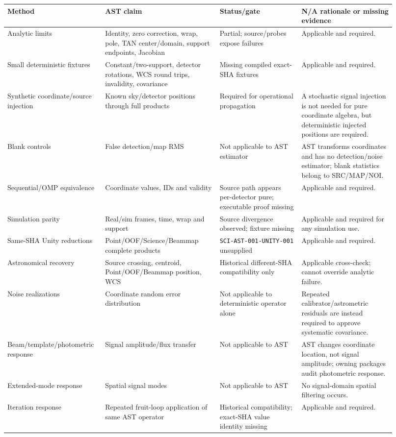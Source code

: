 \documentclass[11pt]{article}
\newcommand{\code}[1]{\nolinkurl{#1}}
\begin{document}
\begin{longtable}{L{0.21\linewidth}L{0.28\linewidth}L{0.20\linewidth}L{0.23\linewidth}}
\toprule
Method & AST claim & Status/gate & N/A rationale or missing evidence \\
\midrule
\endhead
Analytic limits & Identity, zero correction, wrap, pole, TAN center/domain, support endpoints, Jacobian & Partial; source/probes expose failures & Applicable and required. \\
Small deterministic fixtures & Constant/two-support, detector rotations, WCS round trips, invalidity, covariance & Missing compiled exact-SHA fixtures & Applicable and required. \\
Synthetic coordinate/source injection & Known sky/detector positions through full products & Required for operational propagation & A stochastic signal injection is not needed for pure coordinate algebra, but deterministic injected positions are required. \\
Blank controls & False detection/map RMS & Not applicable to AST estimator & AST transforms coordinates and has no detection/noise estimator; blank statistics belong to SRC/MAP/NOI. \\
Sequential/OMP equivalence & Coordinate values, IDs and validity & Source path appears per-detector pure; executable proof missing & Applicable and required. \\
Simulation parity & Real/sim frames, time, wrap and support & Source divergence observed; fixture missing & Applicable and required for any simulation use. \\
Same-SHA Unity reductions & Point/OOF/Science/Beammap complete products & \code{SCI-AST-001-UNITY-001} unsupplied & Applicable and required. \\
Astronomical recovery & Source crossing, centroid, Point/OOF/Beammap position, WCS & Historical different-SHA compatibility only & Applicable cross-check; cannot override analytic failure. \\
Noise realizations & Coordinate random error distribution & Not applicable to deterministic operator alone & Repeated calibrator/astrometric residuals are instead required to approve systematic covariance. \\
Beam/template/photometric response & Signal amplitude/flux transfer & Not applicable to AST & AST changes coordinate location, not signal amplitude; owning packages audit photometric response. \\
Extended-mode response & Spatial signal modes & Not applicable to AST & No signal-domain spatial filtering occurs. \\
Iteration response & Repeated fruit-loop application of same AST operator & Historical compatibility; exact-SHA value identity missing & Applicable and required. \\
\bottomrule
\end{longtable}
\end{document}
